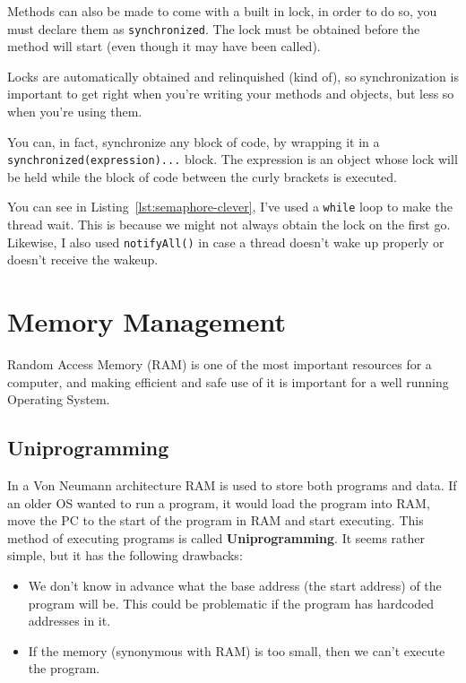 Methods can also be made to come with a built in lock, in order to do so, you
must declare them as \texttt{synchronized}. The lock must be obtained before the
method will start (even though it may have been called).

Locks are automatically obtained and relinquished (kind of), so synchronization
is important to get right when you're writing your methods and objects, but less
so when you're using them.

You can, in fact, synchronize any block of code, by wrapping it in a
\texttt{synchronized(expression){...}} block. The expression is an object whose
lock will be held while the block of code between the curly brackets is
executed.

You can see in Listing~\ref{lst:semaphore-clever}, I've used a \texttt{while}
loop to make the thread wait. This is because we might not always obtain the
lock on the first go. Likewise, I also used \texttt{notifyAll()} in case a
thread doesn't wake up properly or doesn't receive the wakeup.

\section{Memory Management}

Random Access Memory (RAM) is one of the most important resources for a
computer, and making efficient and safe use of it is important for a well
running Operating System.

\subsection{Uniprogramming}

In a Von Neumann architecture RAM is used to store both programs and data. If an
older OS wanted to run a program, it would load the program into RAM, move the
PC to the start of the program in RAM and start executing. This method of
executing programs is called \textbf{Uniprogramming}. It seems rather simple,
but it has the following drawbacks:

\begin{itemize}
	\item We don't know in advance what the base address (the start address) of
	the program will be. This could be problematic if the program has hardcoded
	addresses in it.
	\item If the memory (synonymous with RAM) is too small, then we can't
	execute the program.
\end{itemize}

